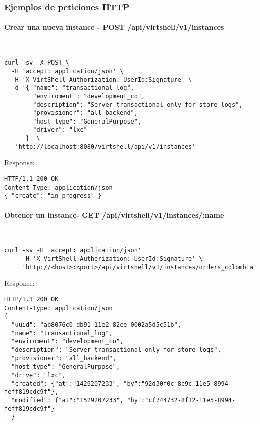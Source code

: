 \subsubsection{Ejemplos de peticiones HTTP}

\paragraph{Crear una nueva instance - POST /api/virtshell/v1/instances} ~\\


\begin{lstlisting}[style=json]
curl -sv -X POST \
  -H 'accept: application/json' \
  -H 'X-VirtShell-Authorization: UserId:Signature' \
  -d '{ "name": "transactional_log",
        "enviroment": "development_co",
        "description": "Server transactional only for store logs", 
        "provisioner": "all_backend",
        "host_type": "GeneralPurpose",
        "driver": "lxc"
      }' \
   'http://localhost:8080/virtshell/api/v1/instances'
\end{lstlisting}

Response:

\begin{lstlisting}[style=json]
HTTP/1.1 200 OK
Content-Type: application/json
{ "create": "in progress" }
\end{lstlisting}

\paragraph{Obtener un instance- GET /api/virtshell/v1/instances/:name} ~\\

\begin{lstlisting}[style=json]
curl -sv -H 'accept: application/json' 
     -H 'X-VirtShell-Authorization: UserId:Signature' \ 
     'http://<host>:<port>/api/virtshell/v1/instances/orders_colombia'
\end{lstlisting}

Response:

\begin{lstlisting}[style=json]
HTTP/1.1 200 OK
Content-Type: application/json
{
  "uuid": "ab8076c0-db91-11e2-82ce-0002a5d5c51b",
  "name": "transactional_log",
  "enviroment": "development_co",
  "description": "Server transactional only for store logs", 
  "provisioner": "all_backend",
  "host_type": "GeneralPurpose",
  "drive": "lxc",
  "created": {"at":"1429207233", "by":"92d30f0c-8c9c-11e5-8994-feff819cdc9f"},
  "modified": {"at":"1529207233", "by":"cf744732-8f12-11e5-8994-feff819cdc9f"}
  }
\end{lstlisting}

